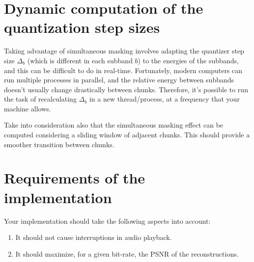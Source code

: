 
\section{Dynamic computation of the quantization step sizes}
Taking advantage of simultaneous masking involves adapting the
quantizer step size $\Delta_b$ (which is different in each subband
$b$) to the energies of the subbands, and this can be difficult to do
in real-time. Fortunately, modern computers can run multiple processes
in parallel, and the relative energy between subbands doesn't usually
change drastically between chunks. Therefore, it's possible to run the
task of recalculating $\Delta_b$ in a new thread/process, at a
frequency that your machine allows.

Take into consideration also that the simultaneous masking effect can
be computed considering a sliding window of adjacent chunks. This
should provide a smoother transition between chunks.

\section{Requirements of the implementation}
Your implementation should take the following aspects into account:
\begin{enumerate}
\item It should not cause interruptions in audio playback.
\item It should maximize, for a given bit-rate, the PSNR of the
  reconstructions.
\end{enumerate}

